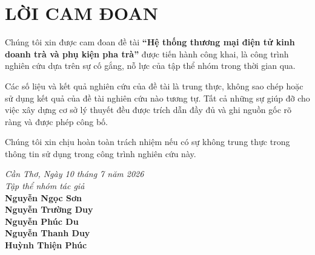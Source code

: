 \chapter*{LỜI CAM ĐOAN}

Chúng tôi xin được cam đoan đề tài \textbf{“Hệ thống thương mại điện tử kinh doanh trà và phụ kiện pha trà”} được tiến hành công khai, là công trình nghiên cứu dựa trên sự cố gắng, nỗ lực của tập thể nhóm trong thời gian qua.

Các số liệu và kết quả nghiên cứu của đề tài là trung thực, không sao chép hoặc sử dụng kết quả của đề tài nghiên cứu nào tương tự. Tất cả những sự giúp đỡ cho việc xây dựng cơ sở lý thuyết đều được trích dẫn đầy đủ và ghi nguồn gốc rõ ràng và được phép công bố.

Chúng tôi xin chịu hoàn toàn trách nhiệm nếu có sự không trung thực trong thông tin sử dụng trong công trình nghiên cứu này.
\vspace{0.5cm}
\begin{flushright}
    \begin{minipage}{0.5\textwidth}
        \centering
        \textit{Cần Thơ, Ngày 10 tháng 7 năm 2026} \\[10pt]
        \textit{Tập thể nhóm tác giả} \\[0.5cm]
        \textbf{Nguyễn Ngọc Sơn} \\[10pt]
        \textbf{Nguyễn Trường Duy} \\[10pt]
        \textbf{Nguyễn Phúc Du} \\[10pt]
        \textbf{Nguyễn Thanh Duy} \\[10pt]
        \textbf{Huỳnh Thiện Phúc}
    \end{minipage}
\end{flushright}
